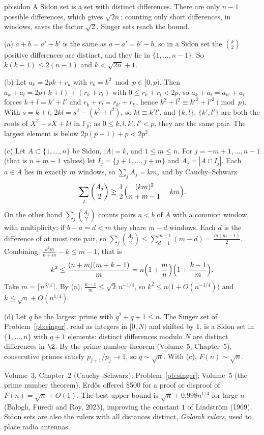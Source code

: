 \begin{solution}{pb:sidon}
\idea A Sidon set is a set with distinct differences. There are only $n-1$ possible differences, which gives $\sqrt{2n}$; counting
only short differences, in windows, saves the factor $\sqrt2$. Singer sets reach the bound.

\writeup (a) $a+b=a'+b'$ is the same as $a-a'=b'-b$, so in a Sidon set the $\binom k2$ positive differences are distinct, and they
lie in $\{1,\dots,n-1\}$. So $k(k-1)\le2(n-1)$ and $k<\sqrt{2n}+1$.

(b) Let $a_k=2pk+r_k$ with $r_k=k^2\bmod p\in[0,p)$. Then $a_k+a_l=2p(k+l)+(r_k+r_l)$ with $0\le r_k+r_l<2p$, so $a_k+a_l=a_{k'}+a_{l'}$
forces $k+l=k'+l'$ and $r_k+r_l=r_{k'}+r_{l'}$, hence $k^2+l^2\equiv k'^2+l'^2\pmod p$. With $s=k+l$, $2kl=s^2-(k^2+l^2)$, so
$kl\equiv k'l'$, and $\{k,l\}$, $\{k',l'\}$ are both the roots of $X^2-sX+kl$ in $\mathbb F_p$; as $0\le k,l,k',l'<p$, they are the
same pair. The largest element is below $2p(p-1)+p<2p^2$.

(c) Let $A\subset\{1,\dots,n\}$ be Sidon, $|A|=k$, and $1\le m\le n$. For $j=-m+1,\dots,n-1$ (that is $n+m-1$ values) let
$I_j=\{j+1,\dots,j+m\}$ and $A_j=|A\cap I_j|$. Each $a\in A$ lies in exactly $m$ windows, so $\sum_jA_j=km$, and by Cauchy--Schwarz
\[
\sum_j\binom{A_j}2\ge\frac12\Bigl(\frac{(km)^2}{n+m-1}-km\Bigr).
\]
On the other hand $\sum_j\binom{A_j}2$ counts pairs $a<b$ of $A$ with a common window, with multiplicity: if $b-a=d<m$ they share $m-d$
windows. Each $d$ is the difference of at most one pair, so $\sum_j\binom{A_j}2\le\sum_{d=1}^{m-1}(m-d)=\frac{m(m-1)}2$. Combining,
$\frac{k^2m}{n+m}-k\le m-1$, that is
\[
k^2\le\frac{(n+m)(m+k-1)}m=n\Bigl(1+\frac mn\Bigr)\Bigl(1+\frac{k-1}m\Bigr).
\]
Take $m=\lceil n^{3/4}\rceil$. By (a), $\frac{k-1}m\le\sqrt2\,n^{-1/4}$, so $k^2\le n\bigl(1+O(n^{-1/4})\bigr)$ and
$k\le\sqrt n+O(n^{1/4})$.

(d) Let $q$ be the largest prime with $q^2+q+1\le n$. The Singer set of Problem~\ref{pb:singer}, read as integers in $[0,N)$ and
shifted by $1$, is a Sidon set in $\{1,\dots,n\}$ with $q+1$ elements: distinct differences modulo $N$ are distinct differences
in $\Z$. By the prime number theorem (Volume~5, Chapter~5), consecutive primes satisfy $p_{j+1}/p_j\to1$, so $q\sim\sqrt n$. With
(c), $F(n)\sim\sqrt n$.

\tools Volume~3, Chapter~2 (Cauchy--Schwarz); Problem~\ref{pb:singer}; Volume~5 (the prime number theorem).
\leads Erdős offered \$500 for a proof or disproof of $F(n)=\sqrt n+O(1)$. The best upper bound is
$\sqrt n+0.998n^{1/4}$ for large $n$ (Balogh, Füredi and Roy, 2023), improving the constant $1$ of Lindström (1969). Sidon sets are
also the rulers with all distances distinct, \emph{Golomb rulers}, used to place radio antennas.
\end{solution}

